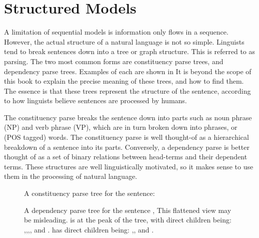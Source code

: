 \documentclass[12pt,parskip]{komatufte}
\begin{document}
\section{Structured Models}

A limitation of sequential models is information only flows in a sequence.
However, the actual structure of a natural language is not so simple.
Linguists tend to break sentences down into a tree or graph structure.
This is referred to as parsing.
The two most common forms are constituency parse trees, and dependency parse trees.
Examples of each are shown in 
It is beyond the scope of this book to explain the precise meaning of these trees, and how to find them.
The essence is that these trees represent the structure of the sentence,
according to how linguists believe sentences are processed by humans.

The constituency parse breaks the sentence down into parts such as noun phrase (NP) and verb phrase (VP),
which are in turn broken down into phrases, or (POS tagged) words.
The constituency parse is well thought-of as a hierarchical breakdown of a sentence into its parts.
Conversely, a dependency parse is better thought of as a set of binary relations between head-terms and their dependent terms.
These structures are well linguistically motivated, so it makes sense to use them in the processing of natural language.

\begin{figure}
	\caption{A constituency parse tree for the sentence: }
	\label{fig:consparse}
\end{figure}


\begin{figure}
	\caption{A dependency parse tree for the sentence ,
	This flattened view may be misleading.
	 is at the peak of the tree, with direct children	being:
	,,,,
	and .
	 has direct children being: ,, and .
	}
	\label{fig:depparse}
\end{figure}
\end{document}
